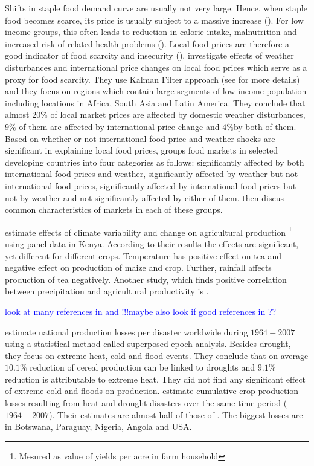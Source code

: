 \documentclass[a4paper,12pt]{article}
\begin{document}
Shifts in staple food demand curve are usually not very large. Hence, when staple food becomes scarce, its price is usually subject to a massive increase (\citealp{Brown2015, brown2014book}). For low income groups, this often leads to reduction in calorie intake, malnutrition and increased risk of related health problems (\citealp{Golden2011, Handa2006}). Local food prices are therefore a good indicator of food scarcity and insecurity (\citealp{baffes2017, Brown2015}). \cite{Brown2015} investigate effects of weather disturbances and international price changes on local food prices which serve as a proxy for food scarcity. They use Kalman Filter approach (see \cite{KoopmanSJ} for more details) and they focus on regions which contain large segments of low income population including locations in Africa, South Asia and Latin America. They conclude that almost $20\%$ of local market prices are affected by domestic weather disturbances, $9\%$ of them are affected by international price change and $4\%$by both of them. Based on whether or not international food price and weather shocks are significant in explaining local food prices, \cite{brown2014book} groups food markets in selected developing countries into four categories as follows: significantly affected by both international food prices and weather, significantly affected by weather but not international food prices, significantly affected by international food prices but not by weather and not significantly affected by either of them. \cite{brown2014book} then discus common characteristics of markets in each of these groups.

\cite{Ochieng2016} estimate effects of climate variability and change on agricultural production \footnote{Mesured as value of yields per acre in farm household} using panel data in Kenya. According to their results the effects are significant, yet different for different crops. Temperature has positive effect on tea and negative effect on production of maize and crop. Further, rainfall affects production of tea negatively. Another study, which finds positive correlation between precipitation and agricultural productivity is \cite{Vrieling2011}.





\textcolor{blue}{look at many references in \cite{Brown2015} and \cite{Ochieng2016} !!!maybe also look if good references in \cite{OxfamIDS}??}


\cite{Pedram2016} estimate national production losses per disaster worldwide during ${1964-2007}$ using a statistical method called superposed epoch analysis. Besides drought, they focus on extreme heat, cold and flood events. They conclude that on average $10.1\%$ reduction of cereal production can be linked to droughts and $9.1\%$ reduction is attributable to extreme heat. They did not find any significant effect of extreme cold and floods on production. \cite{Mehrabi2017} estimate cumulative crop production losses resulting from heat and drought disasters over the same time period (${1964-2007}$). Their estimates are almost half of those of \cite{Pedram2016}. The biggest losses are in Botswana, Paraguay, Nigeria, Angola and USA.
\end{document}
